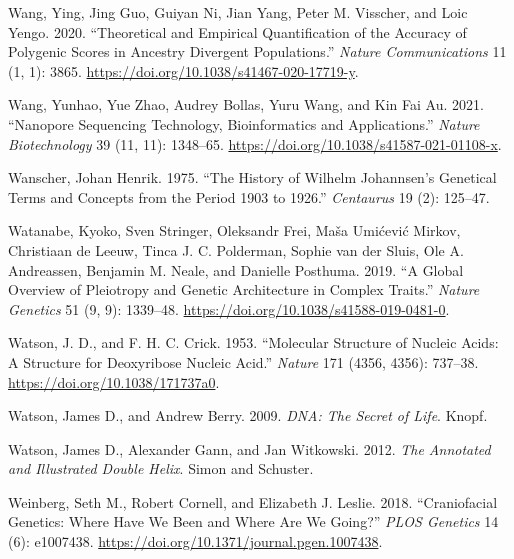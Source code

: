 \documentclass[
]{book}
\newlength{\cslhangindent}
\newlength{\cslentryspacingunit} %
\newenvironment{CSLReferences}[2] %
 {%
  \setlength{\parindent}{0pt}
  \ifodd #1
  \let\oldpar\par
  \def\par{\hangindent=\cslhangindent\oldpar}
  \fi
  \setlength{\parskip}{#2\cslentryspacingunit}
 }%
 {}
\begin{document}
\begin{CSLReferences}{1}{0}
\leavevmode{}%
Wang, Ying, Jing Guo, Guiyan Ni, Jian Yang, Peter M. Visscher, and Loic Yengo. 2020. {``Theoretical and Empirical Quantification of the Accuracy of Polygenic Scores in Ancestry Divergent Populations.''} \emph{Nature Communications} 11 (1, 1): 3865. \url{https://doi.org/10.1038/s41467-020-17719-y}.

\leavevmode{}%
Wang, Yunhao, Yue Zhao, Audrey Bollas, Yuru Wang, and Kin Fai Au. 2021. {``Nanopore Sequencing Technology, Bioinformatics and Applications.''} \emph{Nature Biotechnology} 39 (11, 11): 1348--65. \url{https://doi.org/10.1038/s41587-021-01108-x}.

\leavevmode{}%
Wanscher, Johan Henrik. 1975. {``The History of {Wilhelm Johannsen}'s Genetical Terms and Concepts from the Period 1903 to 1926.''} \emph{Centaurus} 19 (2): 125--47.

\leavevmode{}%
Watanabe, Kyoko, Sven Stringer, Oleksandr Frei, Maša Umićević Mirkov, Christiaan de Leeuw, Tinca J. C. Polderman, Sophie van der Sluis, Ole A. Andreassen, Benjamin M. Neale, and Danielle Posthuma. 2019. {``A Global Overview of Pleiotropy and Genetic Architecture in Complex Traits.''} \emph{Nature Genetics} 51 (9, 9): 1339--48. \url{https://doi.org/10.1038/s41588-019-0481-0}.

\leavevmode{}%
Watson, J. D., and F. H. C. Crick. 1953. {``Molecular {Structure} of {Nucleic Acids}: {A Structure} for {Deoxyribose Nucleic Acid}.''} \emph{Nature} 171 (4356, 4356): 737--38. \url{https://doi.org/10.1038/171737a0}.

\leavevmode{}%
Watson, James D., and Andrew Berry. 2009. \emph{{DNA}: {The} Secret of Life}. {Knopf}.

\leavevmode{}%
Watson, James D., Alexander Gann, and Jan Witkowski. 2012. \emph{The Annotated and Illustrated Double Helix}. {Simon and Schuster}.

\leavevmode{}%
Weinberg, Seth M., Robert Cornell, and Elizabeth J. Leslie. 2018. {``Craniofacial Genetics: {Where} Have We Been and Where Are We Going?''} \emph{PLOS Genetics} 14 (6): e1007438. \url{https://doi.org/10.1371/journal.pgen.1007438}.


\end{CSLReferences}
\end{document}
